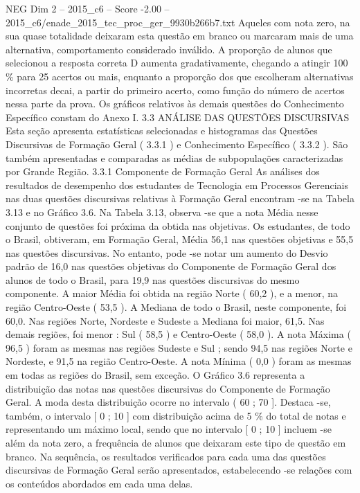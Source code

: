\begin{textsample}{NEG Dim 2 – 2015\_c6 – Score -2.00 – 2015\_c6/enade\_2015\_tec\_proc\_ger\_9930b266b7.txt}
Aqueles com nota zero, na sua quase totalidade deixaram esta questão em branco ou marcaram mais de uma alternativa, comportamento considerado inválido.
A proporção de alunos que selecionou a resposta correta D aumenta gradativamente, chegando a atingir 100 \% para 25 acertos ou mais, enquanto a proporção dos que escolheram alternativas incorretas decai, a partir do primeiro acerto, como função do número de acertos nessa parte da prova.
Os gráficos relativos às demais questões do Conhecimento Específico constam do Anexo I. 3.3 ANÁLISE DAS QUESTÕES DISCURSIVAS Esta seção apresenta estatísticas selecionadas e histogramas das Questões Discursivas de Formação Geral ( 3.3.1 ) e Conhecimento Específico ( 3.3.2 ).
São também apresentadas e comparadas as médias de subpopulações caracterizadas por Grande Região. 3.3.1 Componente de Formação Geral As análises dos resultados de desempenho dos estudantes de Tecnologia em Processos Gerenciais nas duas questões discursivas relativas à Formação Geral encontram -se na Tabela 3.13 e no Gráfico 3.6.
Na Tabela 3.13, observa -se que a nota Média nesse conjunto de questões foi próxima da obtida nas objetivas.
Os estudantes, de todo o Brasil, obtiveram, em Formação Geral, Média 56,1 nas questões objetivas e 55,5 nas questões discursivas.
No entanto, pode -se notar um aumento do Desvio padrão de 16,0 nas questões objetivas do Componente de Formação Geral dos alunos de todo o Brasil, para 19,9 nas questões discursivas do mesmo componente.
A maior Média foi obtida na região Norte ( 60,2 ), e a menor, na região Centro-Oeste ( 53,5 ).
A Mediana de todo o Brasil, neste componente, foi 60,0.
Nas regiões Norte, Nordeste e Sudeste a Mediana foi maior, 61,5.
Nas demais regiões, foi menor : Sul ( 58,5 ) e Centro-Oeste ( 58,0 ).
A nota Máxima ( 96,5 ) foram as mesmas nas regiões Sudeste e Sul ; sendo 94,5 nas regiões Norte e Nordeste, e 91,5 na região Centro-Oeste.
A nota Mínima ( 0,0 ) foram as mesmas em todas as regiões do Brasil, sem exceção.
O Gráfico 3.6 representa a distribuição das notas nas questões discursivas do Componente de Formação Geral.
A moda desta distribuição ocorre no intervalo ( 60 ; 70 ].
Destaca -se, também, o intervalo [ 0 ; 10 ] com distribuição acima de 5 \% do total de notas e representando um máximo local, sendo que no intervalo [ 0 ; 10 ] incluem -se além da nota zero, a frequência de alunos que deixaram este tipo de questão em branco.
Na sequência, os resultados verificados para cada uma das questões discursivas de Formação Geral serão apresentados, estabelecendo -se relações com os conteúdos abordados em cada uma delas.

\end{textsample}
